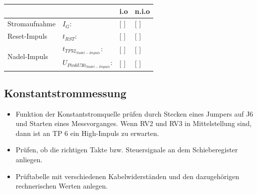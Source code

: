 \documentclass[a4paper,11pt]{scrartcl}
\begin{document}

\renewcommand{\arraystretch}{2}
\begin{tabularx}{\textwidth}{p{}| p{} | p{} | p{}}

 &  & i.o & n.i.o \\

\hline

Stromaufnahme & $I_{G}$: & [ ] & [ ] \\

\hline

Reset-Impuls & $t_{RST}$: & [ ] & [ ] \\

\hline

\multirow{2}{*}{Nadel-Impuls}
		& $t_{TP32_{Nadel-Impuls}}$:	 				& [ ] & [ ] \\
		& $U_{Pin6 U30_{Nadel-Impuls}}$:				& [ ] & [ ] \\
		
\end{tabularx}
\renewcommand{\arraystretch}{1}


\newpage
\subsection{Konstantstrommessung}


\begin{itemize}
	\item{Funktion der Konstantstromquelle prüfen durch Stecken eines Jumpers auf J6 und Starten eines Messvorganges. Wenn RV2 und RV3 in Mittelstellung sind, dann ist an TP 6 ein High-Impuls zu erwarten.}
	
	\item{Prüfen, ob die richtigen Takte bzw. Steuersignale an dem Schieberegister anliegen.}
	
	\item{Prüftabelle mit verschiedenen Kabelwiderständen und den dazugehörigen rechnerischen Werten anlegen.}
\end{itemize}
\end{document}
